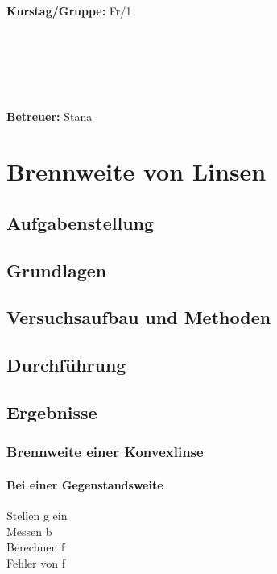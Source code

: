 \documentclass{article}
\begin{document}
\begin{verbatim}


\end{verbatim}
			\begin{flushleft}
			\textbf{\Large{Kurstag/Gruppe:}} \Large{Fr/1}
			\end{flushleft}

\begin{verbatim}






\end{verbatim}
			\begin{flushleft}
			\LARGE{\textbf{Betreuer:}}	\Large{Stana}	
			\end{flushleft}
\newpage	

\section{Brennweite von Linsen}

\subsection{Aufgabenstellung}
\subsection{Grundlagen}
\subsection{Versuchsaufbau und Methoden}
\subsection{Durchführung}
\subsection{Ergebnisse}
\subsubsection*{Brennweite einer Konvexlinse}
\paragraph{Bei einer Gegenstandsweite}

Stellen g ein\\
Messen b\\
Berechnen f\\
Fehler von f\\
\end{document}
